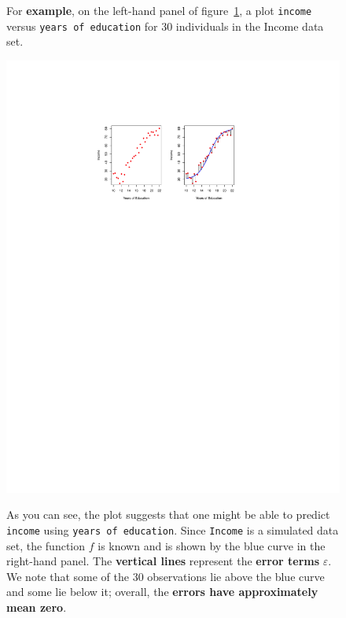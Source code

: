 \documentclass[a4paper]{article}
\newcommand{\example}[1]{\textcolor{Green4}{\textbf{#1}}}
\begin{document}
    \begin{figure}[!htp]
        \begin{examplebox}
            For \example{example}, on the left-hand panel of figure~\ref{fig: error term systematic}, a plot \texttt{income} versus \texttt{years of education} for 30 individuals in the Income data set.
            
            \begin{center}
                \includegraphics[width=\textwidth]{img/error-term-systematic-1.pdf}
                \label{fig: error term systematic}
            \end{center}


            \noindent
            As you can see, the plot suggests that one might be able to predict \texttt{income} using \texttt{years of education}. Since \texttt{Income} is a simulated data set, the function $f$ is known and is shown by the blue curve in the right-hand panel. The \textbf{vertical lines} represent the \textbf{error terms} $\varepsilon$. We note that some of the 30 observations lie above the blue curve and some lie below it; overall, the \textbf{errors have approximately mean zero}.
        \end{examplebox}
    \end{figure}
\end{document}
